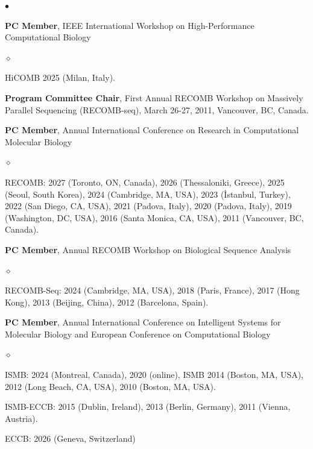 \documentclass[margin,line]{res}
\newenvironment{list2}{
  \begin{list}{$\bullet$}{%
      \setlength{\itemsep}{0.1cm}
      \setlength{\parsep}{0in} \setlength{\parskip}{0in}
      \setlength{\topsep}{0in} \setlength{\partopsep}{0in} 
      \setlength{\leftmargin}{0.2in}}}{\end{list}}
\newenvironment{list3}{
  \begin{list}{$\diamond$}{%
      \setlength{\itemsep}{0in}
      \setlength{\parsep}{0.1cm} \setlength{\parskip}{0.1cm}
      \setlength{\topsep}{0.1cm} \setlength{\partopsep}{0.1cm} 
      \setlength{\leftmargin}{0.2in}}}{\end{list}}
\begin{document}
\begin{resume}
\begin{list2}
    \item 
        \textbf{PC Member}, IEEE International Workshop on High-Performance Computational Biology
        \begin{list3}
            \item HiCOMB 2025 (Milan, Italy).
        \end{list3}
        
    \item
        \textbf{Program Committee Chair}, First Annual RECOMB Workshop on Massively Parallel Sequencing (RECOMB-seq), March 26-27, 2011, Vancouver, BC, Canada.      

\clearpage
    \item
        \textbf{PC Member}, Annual International Conference on Research in Computational Molecular Biology
        \begin{list3}
            \item RECOMB: 2027 (Toronto, ON, Canada), 2026 (Thessaloniki, Greece), 2025 (Seoul, South Korea), 2024 (Cambridge, MA, USA), 2023 (İstanbul, Turkey), 2022 (San Diego, CA, USA),
            2021 (Padova, Italy), 2020 (Padova, Italy),  2019 (Washington, DC, USA),   2016 (Santa Monica, CA, USA),  2011 (Vancouver, BC, Canada).
        \end{list3}
      
    \item 
        \textbf{PC Member},  Annual RECOMB Workshop on Biological Sequence Analysis        
        \begin{list3}
            \item RECOMB-Seq: 2024 (Cambridge, MA, USA), 2018 (Paris, France),  2017 (Hong Kong), 2013 (Beijing, China),  2012 (Barcelona, Spain).
        \end{list3}

    \item
        \textbf{PC Member}, Annual International Conference on Intelligent Systems for Molecular Biology and  European Conference on  Computational Biology  
        \begin{list3}
            \item ISMB: 2024 (Montreal, Canada), 2020 (online), ISMB 2014 (Boston, MA, USA), 2012 (Long Beach, CA, USA),  2010 (Boston, MA, USA).
            \item ISMB-ECCB: 2015 (Dublin, Ireland), 2013 (Berlin, Germany), 2011 (Vienna, Austria).
         \item ECCB: 2026 (Geneva, Switzerland)
        \end{list3}


\end{list2}
\end{resume}
\end{document}
